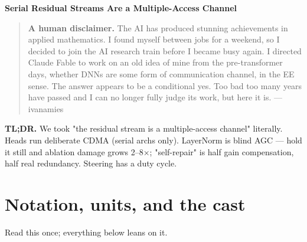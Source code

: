 \documentclass[10pt]{article}
\begin{document}
\begin{center}{\LARGE\bfseries Serial Residual Streams Are a Multiple-Access Channel}\end{center}

\begin{quote}\textbf{A human disclaimer.} The AI has produced stunning achievements in applied mathematics. I found myself between jobs for a weekend, so I decided to join the AI research train before I became busy again. I directed Claude Fable to work on an old idea of mine from the pre-transformer days, whether DNNs are some form of communication channel, in the EE sense. The answer appears to be a conditional yes. Too bad too many years have passed and I can no longer fully judge its work, but here it is. --- ivanamies\end{quote}

\textbf{TL;DR.} We took "the residual stream is a multiple-access channel" literally. Heads run
deliberate CDMA (serial archs only). LayerNorm is blind AGC --- hold it still and ablation damage
grows 2--8$\times$; "self-repair" is half gain compensation, half real redundancy. Steering has a duty
cycle.

\section{Notation, units, and the cast}

Read this once; everything below leans on it.
\end{document}
